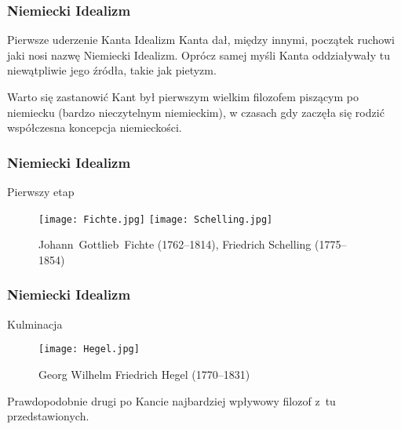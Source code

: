 \documentclass{beamer}  %
\begin{document}
\begin{frame}
  \frametitle{Niemiecki Idealizm}

  \begin{block}{Pierwsze uderzenie Kanta}
    Idealizm Kanta dał, między innymi, początek ruchowi jaki nosi
    nazwę Niemiecki Idealizm. Oprócz samej myśli Kanta oddziaływały tu
    niewątpliwie jego źródła, takie jak pietyzm.
  \end{block}
  \pause

  \begin{block}{Warto się zastanowić}
    Kant był pierwszym wielkim filozofem piszącym po niemiecku (bardzo
    nieczytelnym niemieckim), w czasach gdy zaczęła się rodzić
    współczesna koncepcja niemieckości.
  \end{block}

\end{frame}



\begin{frame}
  \frametitle{Niemiecki Idealizm}

  \begin{block}{Pierwszy etap}
    \begin{figure}
      \centering

      \texttt{[image: Fichte.jpg]}
      \texttt{[image: Schelling.jpg]}
      \caption{Johann~Gottlieb~Fichte (1762--1814), Friedrich
        Schelling (1775--1854)}
    \end{figure}
  \end{block}

\end{frame}



\begin{frame}
  \frametitle{Niemiecki Idealizm}

  \begin{block}{Kulminacja}
    \begin{figure}
      \centering

      \texttt{[image: Hegel.jpg]}
      \caption{Georg Wilhelm Friedrich Hegel (1770--1831)}
    \end{figure}
  \end{block}

  \begin{block}{}
    Prawdopodobnie drugi po Kancie najbardziej wpływowy filozof z~tu
    przedstawionych.
  \end{block}

\end{frame}
\end{document}
